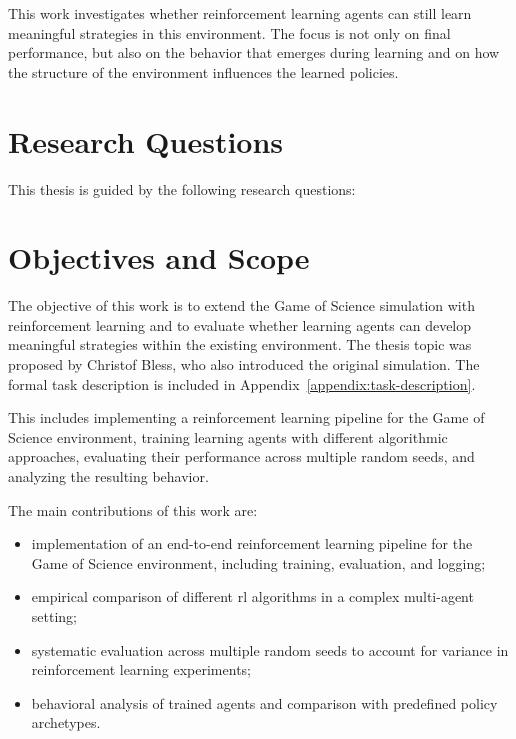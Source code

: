 \documentclass[english,bachelor]{hsluthesis}
\begin{document}
This work investigates whether reinforcement learning agents can still learn meaningful strategies in this environment. The focus is not only on final performance, but also on the behavior that emerges during learning and on how the structure of the environment influences the learned policies.

\section{Research Questions}

This thesis is guided by the following research questions:




\section{Objectives and Scope}

The objective of this work is to extend the Game of Science simulation with reinforcement learning and to evaluate whether learning agents can develop meaningful strategies within the existing environment. The thesis topic was proposed by Christof Bless, who also introduced the original simulation. The formal task description is included in Appendix~\ref{appendix:task-description}.

This includes implementing a reinforcement learning pipeline for the Game of Science environment, training learning agents with different algorithmic approaches, evaluating their performance across multiple random seeds, and analyzing the resulting behavior.

The main contributions of this work are:

\begin{itemize}
    \item implementation of an end-to-end reinforcement learning pipeline for the Game of Science environment, including training, evaluation, and logging;
    \item empirical comparison of different \gls{rl} algorithms in a complex multi-agent setting;
    \item systematic evaluation across multiple random seeds to account for variance in reinforcement learning experiments;
    \item behavioral analysis of trained agents and comparison with predefined policy archetypes.
\end{itemize}
\end{document}
